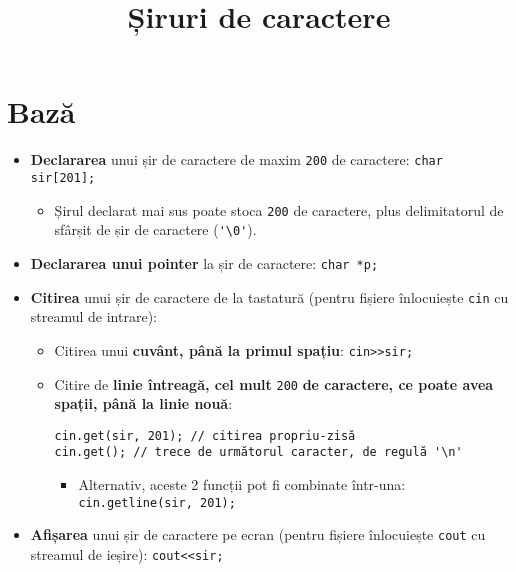 \documentclass{article}
\title{Șiruri de caractere}
\author{}
\date{}
\begin{document}
\maketitle
\section*{Bază}
\begin{itemize}
    \item \textbf{Declararea} unui șir de caractere de maxim \verb|200| de caractere: \verb|char sir[201];|
    \begin{itemize}
        \item Șirul declarat mai sus poate stoca \verb|200| de caractere, plus delimitatorul de sfârșit de șir de caractere (\verb|'\0'|).
    \end{itemize}
    \item \textbf{Declararea unui pointer} la șir de caractere: \verb|char *p;|
    \item \textbf{Citirea} unui șir de caractere de la tastatură (pentru fișiere înlocuiește \verb|cin| cu streamul de intrare):
    \begin{itemize}
        \item Citirea unui \textbf{cuvânt, până la primul spațiu}: \verb|cin>>sir;|
        \item Citire de \textbf{linie întreagă, cel mult }\verb|200|\textbf{ de caractere, ce poate avea spații, până la linie nouă}:
        \begin{verbatim}
cin.get(sir, 201); // citirea propriu-zisă
cin.get(); // trece de următorul caracter, de regulă '\n'
        \end{verbatim}
        \begin{itemize}
            \item Alternativ, aceste 2 funcții pot fi combinate într-una: \verb|cin.getline(sir, 201);|
        \end{itemize}
    \end{itemize}
    \item \textbf{Afișarea} unui șir de caractere pe ecran (pentru fișiere înlocuiește \verb|cout| cu streamul de ieșire): \verb|cout<<sir;|
\end{itemize}
\end{document}
